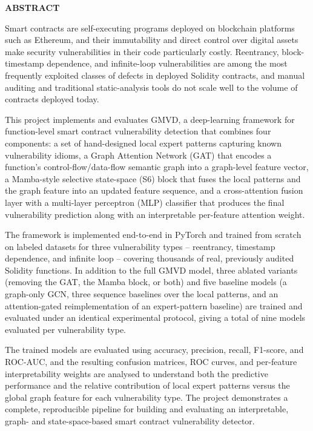 \documentclass[12pt, a4paper, openright, twoside]{report}
\begin{document}
\begin{center}
\textbf{{\Large ABSTRACT}}\\
\end{center}

Smart contracts are self-executing programs deployed on blockchain platforms such as Ethereum, and their immutability and direct control over digital assets make security vulnerabilities in their code particularly costly. Reentrancy, block-timestamp dependence, and infinite-loop vulnerabilities are among the most frequently exploited classes of defects in deployed Solidity contracts, and manual auditing and traditional static-analysis tools do not scale well to the volume of contracts deployed today.

This project implements and evaluates GMVD, a deep-learning framework for function-level smart contract vulnerability detection that combines four components: a set of hand-designed local expert patterns capturing known vulnerability idioms, a Graph Attention Network (GAT) that encodes a function's control-flow/data-flow semantic graph into a graph-level feature vector, a Mamba-style selective state-space (S6) block that fuses the local patterns and the graph feature into an updated feature sequence, and a cross-attention fusion layer with a multi-layer perceptron (MLP) classifier that produces the final vulnerability prediction along with an interpretable per-feature attention weight.

The framework is implemented end-to-end in PyTorch and trained from scratch on labeled datasets for three vulnerability types -- reentrancy, timestamp dependence, and infinite loop -- covering thousands of real, previously audited Solidity functions. In addition to the full GMVD model, three ablated variants (removing the GAT, the Mamba block, or both) and five baseline models (a graph-only GCN, three sequence baselines over the local patterns, and an attention-gated reimplementation of an expert-pattern baseline) are trained and evaluated under an identical experimental protocol, giving a total of nine models evaluated per vulnerability type.

The trained models are evaluated using accuracy, precision, recall, F1-score, and ROC-AUC, and the resulting confusion matrices, ROC curves, and per-feature interpretability weights are analysed to understand both the predictive performance and the relative contribution of local expert patterns versus the global graph feature for each vulnerability type. The project demonstrates a complete, reproducible pipeline for building and evaluating an interpretable, graph- and state-space-based smart contract vulnerability detector.
\end{document}
